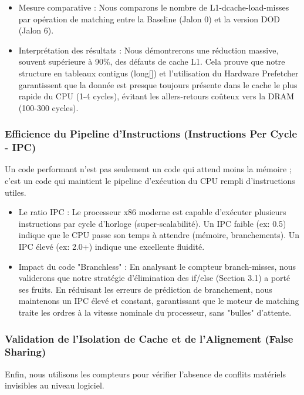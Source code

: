 \begin{itemize}
    \item Mesure comparative : Nous comparons le nombre de L1-dcache-load-misses par opération de matching entre la Baseline (Jalon 0) et la version DOD (Jalon 6).
    \item Interprétation des résultats : Nous démontrerons une réduction massive, souvent supérieure à 90\%, des défauts de cache L1. Cela prouve que notre structure en tableaux contigus (long[]) et l'utilisation du Hardware Prefetcher garantissent que la donnée est presque toujours présente dans le cache le plus rapide du CPU (1-4 cycles), évitant les allers-retours coûteux vers la DRAM (100-300 cycles).
\end{itemize}

\subsubsection{Efficience du Pipeline d'Instructions (Instructions Per Cycle - IPC)}

Un code performant n'est pas seulement un code qui attend moins la mémoire ; c'est un code qui maintient le pipeline d'exécution du CPU rempli d'instructions utiles.

\begin{itemize}
    \item Le ratio IPC : Le processeur x86 moderne est capable d'exécuter plusieurs instructions par cycle d'horloge (super-scalabilité). Un IPC faible (ex: 0.5) indique que le CPU passe son temps à attendre (mémoire, branchements). Un IPC élevé (ex: 2.0+) indique une excellente fluidité.
    \item Impact du code "Branchless" : En analysant le compteur branch-misses, nous validerons que notre stratégie d'élimination des if/else (Section 3.1) a porté ses fruits. En réduisant les erreurs de prédiction de branchement, nous maintenons un IPC élevé et constant, garantissant que le moteur de matching traite les ordres à la vitesse nominale du processeur, sans "bulles" d'attente.
\end{itemize}

\subsubsection{Validation de l'Isolation de Cache et de l'Alignement (False Sharing)}

Enfin, nous utilisons les compteurs pour vérifier l'absence de conflits matériels invisibles au niveau logiciel.

